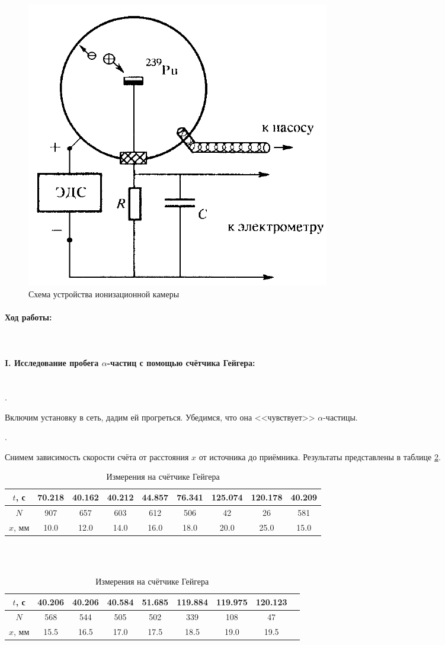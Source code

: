 \documentclass[a4paper, 12pt]{article}
\newcommand{\parag}[1]{\paragraph*{#1:}}
\newcounter{Points}
\newcommand{\point}{\arabic{Points}. \addtocounter{Points}{1}}
\begin{document}
\begin{figure}[!h]
    \includegraphics[scale = 0.4]{Workplace3}
    \centering
    \caption{Схема устройства ионизационной камеры}
    \label{img:work1}
\end{figure}

\parag {Ход работы} ~\\

\parag {I. Исследование пробега $\alpha$-частиц с помощью счётчика Гейгера} ~\\

\point Включим установку в сеть, дадим ей прогреться. Убедимся, что она <<чувствует>> $\alpha$-частицы. 

\point Снимем зависимость скорости счёта от расстояния $x$ от источника до приёмника. Результаты представлены в таблице \ref{tab:geig}.

\begin{table}[!h]
    \centering
    \begin{tabular}{|c|c|c|c|c|c|c|c|c|}
        \hline
        $t$, с & 70.218 & 40.162 & 40.212 & 44.857 & 76.341 & 125.074 & 120.178 & 40.209 \\ \hline
        $N$ & 907 & 657 & 603 & 612 & 506 & 42 & 26 & 581 \\ \hline
        $x$, мм & 10.0 & 12.0 & 14.0 & 16.0 & 18.0 & 20.0 & 25.0 & 15.0 \\ \hline
    \end{tabular}
    \\~\\
    \begin{tabular}{|c|c|c|c|c|c|c|c|c|}
        \hline
        $t$, с & 40.206 & 40.206 & 40.584 & 51.685 & 119.884 & 119.975 & 120.123 \\ \hline
        $N$ & 568 & 544 & 505 & 502 & 339 & 108 & 47 \\ \hline
        $x$, мм & 15.5 & 16.5 & 17.0 & 17.5 & 18.5 & 19.0 & 19.5 \\ \hline
    \end{tabular}
    \caption {Измерения на счётчике Гейгера}
    \label{tab:geig}
\end{table}
\end{document}

